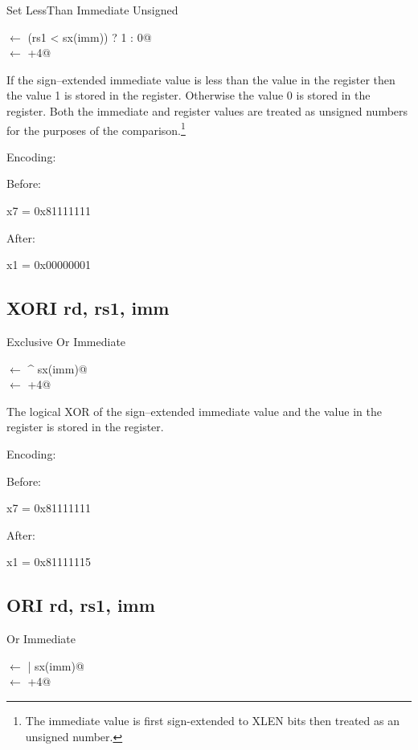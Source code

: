 Set LessThan Immediate Unsigned

\verb@rd@ $\leftarrow$ \verb@(rs1 < sx(imm)) ? 1 : 0@\\
\verb@pc@ $\leftarrow$ \verb@pc+4@

If the sign--extended immediate value is less than the value
in the  register then the value 1 is stored in the 
 register.  Otherwise the value 0 is stored in the
 register.  Both the immediate and  register
values are treated as unsigned numbers for the purposes of the 
comparison.\footnote{The immediate value is first sign-extended to
XLEN bits then treated as an unsigned number.\cite[p.~14]{rvismv1v22:2017}}


Encoding:


Before:

x7 = 0x81111111

After:

x1 = 0x00000001

\subsection{XORI rd, rs1, imm}

Exclusive Or Immediate

\verb@rd@ $\leftarrow$  ^ sx(imm)@\\
\verb@pc@ $\leftarrow$ \verb@pc+4@

The logical XOR of the sign--extended immediate value and the value 
in the  register is stored in the  register.

Encoding:


Before:

x7 = 0x81111111

After:

x1 = 0x81111115

\subsection{ORI rd, rs1, imm}

Or Immediate

\verb@rd@ $\leftarrow$  | sx(imm)@\\
\verb@pc@ $\leftarrow$ \verb@pc+4@

